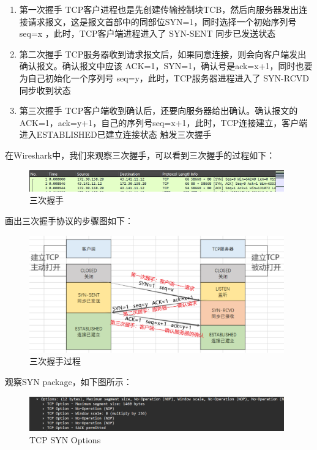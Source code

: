 \documentclass{article}
\begin{document}
	\begin{enumerate}[noitemsep, label={{\arabic*})}]
		\item 第一次握手 TCP客户进程也是先创建传输控制块TCB，然后向服务器发出连接请求报文，这是报文首部中的同部位SYN=1，同时选择一个初始序列号 seq=x ，此时，TCP客户端进程进入了 SYN-SENT 同步已发送状态
		
		\item 第二次握手 TCP服务器收到请求报文后，如果同意连接，则会向客户端发出确认报文。确认报文中应该 ACK=1，SYN=1，确认号是ack=x+1，同时也要为自己初始化一个序列号 seq=y，此时，TCP服务器进程进入了 SYN-RCVD 同步收到状态
		
		\item 第三次握手 TCP客户端收到确认后，还要向服务器给出确认。确认报文的ACK=1，ack=y+1，自己的序列号seq=x+1，此时，TCP连接建立，客户端进入ESTABLISHED已建立连接状态 触发三次握手
	\end{enumerate}\textbf{}
	
	在Wireshark中，我们来观察三次握手，可以看到三次握手的过程如下：
	
	\begin{figure}[H]
		\centering
		\includegraphics[width=11cm]{images/17.三次握手.png}
		\caption{三次握手}
	\end{figure}
	
	画出三次握手协议的步骤图如下：
	
	\begin{figure}[H]
		\centering
		\includegraphics[width=11cm]{images/18.三次握手过程.png}
		\caption{三次握手过程}
	\end{figure}
	
	观察SYN package，如下图所示：
	
	\begin{figure}[H]
		\centering
		\includegraphics[width=11cm]{images/19.TCP SYN Options.png}
		\caption{TCP SYN Options}
	\end{figure}
	
\end{document}

